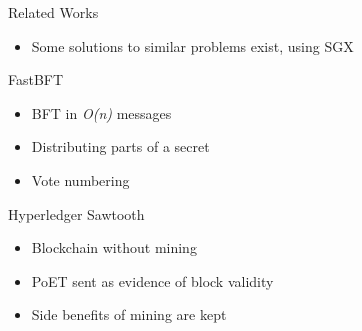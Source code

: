 \documentclass{beamer}
\begin{document}
	\begin{frame}{Related Works} %
		\begin{itemize}
			\item Some solutions to similar problems exist, using SGX
		\end{itemize}
	\end{frame}

	\begin{frame}{FastBFT} %
		\begin{itemize}
			\item BFT in \textit{O(n)} messages
			\item Distributing parts of a secret
			\item Vote numbering
		\end{itemize}
	\end{frame}

	\begin{frame}{Hyperledger Sawtooth}	%
		\begin{itemize}
			\item Blockchain without mining
			\item PoET sent as evidence of block validity
			\item Side benefits of mining are kept
		\end{itemize}
	\end{frame}
\end{document}
